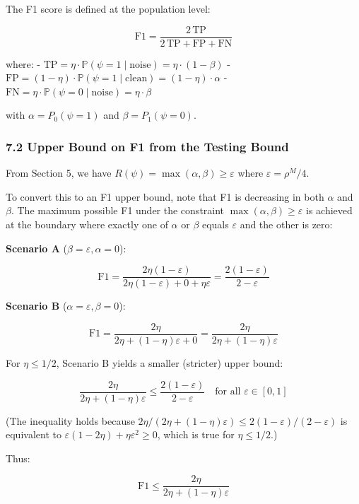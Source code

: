 \documentclass[
  12pt,
]{article}
\begin{document}
The F1 score is defined at the population level:

\[\text{F1} = \frac{2\,\text{TP}}{2\,\text{TP} + \text{FP} + \text{FN}}\]

where: -
\(\text{TP} = \eta \cdot \mathbb{P}(\psi = 1 \mid \text{noise}) = \eta \cdot (1 - \beta)\)
-
\(\text{FP} = (1-\eta) \cdot \mathbb{P}(\psi = 1 \mid \text{clean}) = (1-\eta) \cdot \alpha\)
-
\(\text{FN} = \eta \cdot \mathbb{P}(\psi = 0 \mid \text{noise}) = \eta \cdot \beta\)

with \(\alpha = P_0(\psi=1)\) and \(\beta = P_1(\psi=0)\).

\subsubsection{7.2 Upper Bound on F1 from the Testing
Bound}\label{upper-bound-on-f1-from-the-testing-bound}

From Section 5, we have
\(R(\psi) = \max(\alpha, \beta) \geq \varepsilon\) where
\(\varepsilon = \rho^M/4\).

To convert this to an F1 upper bound, note that F1 is decreasing in both
\(\alpha\) and \(\beta\). The maximum possible F1 under the constraint
\(\max(\alpha, \beta) \geq \varepsilon\) is achieved at the boundary
where exactly one of \(\alpha\) or \(\beta\) equals \(\varepsilon\) and
the other is zero:

\textbf{Scenario A} (\(\beta = \varepsilon, \alpha = 0\)):

\[\text{F1} = \frac{2\eta(1-\varepsilon)}{2\eta(1-\varepsilon) + 0 + \eta\varepsilon}
= \frac{2(1-\varepsilon)}{2-\varepsilon}\]

\textbf{Scenario B} (\(\alpha = \varepsilon, \beta = 0\)):

\[\text{F1} = \frac{2\eta}{2\eta + (1-\eta)\varepsilon + 0}
= \frac{2\eta}{2\eta + (1-\eta)\varepsilon}\]

For \(\eta \leq 1/2\), Scenario B yields a smaller (stricter) upper
bound:

\[\frac{2\eta}{2\eta + (1-\eta)\varepsilon} \leq \frac{2(1-\varepsilon)}{2-\varepsilon}
\quad\text{for all } \varepsilon \in [0,1]\]

(The inequality holds because
\(2\eta/(2\eta+(1-\eta)\varepsilon) \leq 2(1-\varepsilon)/(2-\varepsilon)\)
is equivalent to \(\varepsilon(1-2\eta) + \eta\varepsilon^2 \geq 0\),
which is true for \(\eta \leq 1/2\).)

Thus:

\[\text{F1} \leq \frac{2\eta}{2\eta + (1-\eta)\varepsilon}\]
\end{document}
